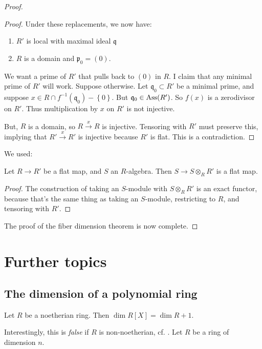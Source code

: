 \begin{proof}
\begin{proof}
Under these replacements, we now have:
\begin{enumerate}
\item $R'$ is local with maximal ideal $\mathfrak{q}$ 
\item $R$ is a domain and $\mathfrak{p}_0 = (0)$.
\end{enumerate}
We want a prime of $R'$ that pulls back to $(0)$ in $R$. I claim that any
minimal prime of $R'$ will work. 
Suppose otherwise. Let $\mathfrak{q}_0 \subset R'$ be a minimal prime, and
suppose $x \in R \cap f^{-1}(\mathfrak{q}_0) - \left\{0\right\}$. But
$\mathfrak{q}_0 \in \operatorname{Ass}(R')$. So $f(x)$ is
a zerodivisor on $R'$. Thus multiplication by $x$ on $R'$ is not injective. 

But, $R$ is a domain, so $R \stackrel{x}{\to} R$ is injective. Tensoring with
$R'$ must preserve this, implying that $R' \stackrel{x}{\to} R'$ is injective
because $R'$ is flat. This is a contradiction.
\end{proof} 

We used:
\begin{lemma} 
Let $R \to R'$ be a flat map, and $S$ an $R$-algebra. Then $S \to S \otimes_R
R'$ is a flat map.
\end{lemma} 
\begin{proof} 
The construction of taking an $S$-module with $S \otimes_R R'$ is an exact
functor, because that's the same thing as taking an $S$-module, restricting to
$R$, and tensoring with $R'$.
\end{proof} 
The proof of the fiber dimension theorem is now complete.

\end{proof} 

\section{Further topics}
\subsection{The dimension of a polynomial ring}

\begin{theorem} 
Let $R$ be a noetherian ring. Then $\dim R[X] = \dim R+1$.
\end{theorem} 

Interestingly, this is \emph{false} if $R$ is non-noetherian, cf. \cite{}.
Let $R$ be a ring of dimension $n$. 

